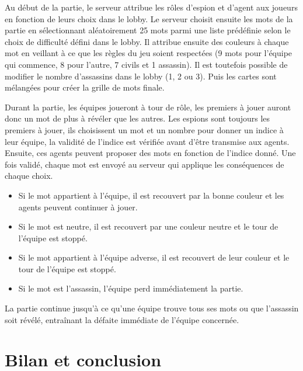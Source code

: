 \documentclass[12pt,a4paper]{article}
\begin{document}
        \vspace{0.5cm}

        Au début de la partie, le serveur attribue les rôles d'espion et d'agent aux joueurs en fonction de leurs choix dans le lobby.
        Le serveur choisit ensuite les mots de la partie en sélectionnant aléatoirement 25 mots parmi une liste prédéfinie selon le choix de difficulté défini dans le lobby.
        Il attribue ensuite des couleurs à chaque mot en veillant à ce que les règles du jeu soient respectées (9 mots pour l'équipe qui commence, 8 pour l'autre, 7 civils et 1 assassin).
        Il est toutefois possible de modifier le nombre d'assassins dans le lobby (1, 2 ou 3).
        Puis les cartes sont mélangées pour créer la grille de mots finale.

        \vspace{0.5cm}

        Durant la partie, les équipes joueront à tour de rôle, les premiers à jouer auront donc un mot de plus à révéler que les autres.
        Les espions sont toujours les premiers à jouer, ils choisissent un mot et un nombre pour donner un indice à leur équipe, la validité de l'indice est vérifiée avant d'être transmise aux agents.
        Ensuite, ces agents peuvent proposer des mots en fonction de l'indice donné.
        Une fois validé, chaque mot est envoyé au serveur qui applique les conséquences de chaque choix.
        \begin{itemize}
            \item Si le mot appartient à l'équipe, il est recouvert par la bonne couleur et les agents peuvent continuer à jouer.
            \item Si le mot est neutre, il est recouvert par une couleur neutre et le tour de l'équipe est stoppé.
            \item Si le mot appartient à l'équipe adverse, il est recouvert de leur couleur et le tour de l'équipe est stoppé.
            \item Si le mot est l'assassin, l'équipe perd immédiatement la partie.
        \end{itemize}
        La partie continue jusqu'à ce qu'une équipe trouve tous ses mots ou que l'assassin soit révélé, entraînant la défaite immédiate de l'équipe concernée.

    \newpage
    \section{Bilan et conclusion}
        \label{sec:bilan}
\end{document}
